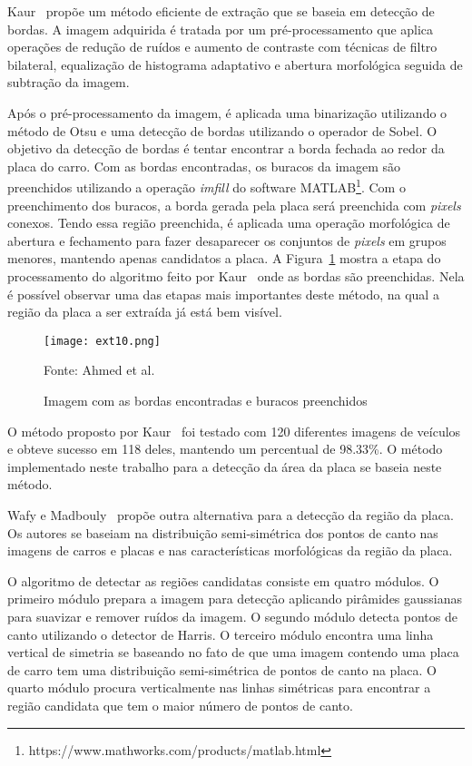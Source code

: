 Kaur~\cite{kaur2014efficient} propõe um método eficiente de
extração que se baseia em detecção de bordas. A imagem adquirida é tratada por um pré-processamento que aplica operações de redução de ruídos e aumento de contraste com técnicas de filtro bilateral, equalização de histograma adaptativo e abertura morfológica seguida de subtração da imagem.

Após o pré-processamento da imagem, é aplicada uma binarização utilizando o método de Otsu e uma detecção de bordas utilizando o operador de Sobel. O objetivo da detecção de bordas é tentar encontrar a borda fechada ao redor da placa do carro. Com as bordas encontradas, os buracos da imagem são preenchidos utilizando a operação \emph{imfill} do software MATLAB\footnote{https://www.mathworks.com/products/matlab.html}. Com o preenchimento dos buracos, a borda gerada pela placa será preenchida com \emph{pixels} conexos. Tendo essa região preenchida, é aplicada uma operação morfológica de abertura e fechamento para fazer desaparecer os conjuntos de \emph{pixels} em grupos menores, mantendo apenas candidatos a placa. A Figura~\ref{fig:wafy_example} mostra a etapa do processamento do algoritmo feito por Kaur~\cite{kaur2014efficient} onde as bordas são preenchidas. Nela é possível observar uma das etapas mais importantes deste método, na qual a região da placa a ser extraída já está bem visível.

\begin{figure}[H]
	\centering
	\texttt{[image: ext10.png]}
	\caption{Imagem com as bordas encontradas e buracos preenchidos}
Fonte: Ahmed et al.~\cite{wafy2016efficient}
	\label{fig:wafy_example}
\end{figure}

O método proposto por Kaur~\cite{kaur2014efficient} foi testado com 120 diferentes imagens de veículos e obteve sucesso em 118 deles, mantendo um percentual de 98.33\%. O método implementado neste trabalho para a detecção da área da placa se baseia neste método.

Wafy e Madbouly~\cite{wafy2016efficient} propõe outra alternativa para a detecção da região da placa. Os autores se baseiam na distribuição semi-simétrica dos pontos de canto nas imagens de carros e placas e nas características morfológicas da região da placa.

O algoritmo de detectar as regiões candidatas consiste em quatro módulos. O primeiro módulo prepara a imagem para detecção aplicando pirâmides gaussianas para suavizar e remover ruídos da imagem. O segundo módulo detecta pontos de canto utilizando o detector de Harris. O terceiro módulo encontra uma linha vertical de simetria se baseando no fato de que uma imagem contendo uma placa de carro tem uma distribuição semi-simétrica de pontos de canto na placa. O quarto módulo procura verticalmente nas linhas simétricas para encontrar a região candidata que tem o maior número de pontos de canto. 

